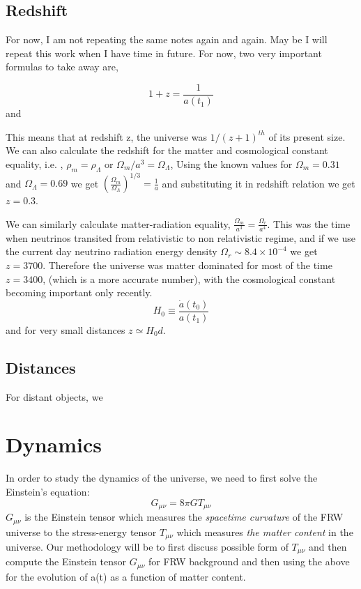 \documentclass[12pt]{report}
\newcommand{\tit}[1]{\textit{#1}}
\begin{document}
\subsection{Redshift}
For now, I am not repeating the same notes again and again. May be I will repeat this work when I have time in future. For now, two very important formulas to take away are,

\begin{equation}
1+z=\frac{1}{a(t_1)}
\end{equation}
and 

This means that at redshift z, the universe was $1/(z+1)^{th}$ of its present size. We can also calculate the redshift for the matter and cosmological constant equality, i.e. , $\rho_m= \rho_\Lambda$ or $\Omega_m/a^3= \Omega_\Lambda$, Using the known values for $\Omega_m=0.31$ and $\Omega_\Lambda=0.69$ we get ${\left(\frac{\Omega_m}{\Omega_\Lambda}\right)}^{1/3}=\frac{1}{a}$ and substituting it in redshift relation we get $z=0.3$.

We can similarly calculate matter-radiation equality, $\frac{\Omega_m}{a^3}=\frac{\Omega_r}{a^4}$. This was the time when neutrinos transited from relativistic to non relativistic regime, and if we use the current day neutrino radiation energy density $\Omega_r \sim 8.4 \times 10^{-4}$ we get  $z=3700$. Therefore the universe was matter dominated for most of the time $z=3400$, (which is a more accurate number), with the cosmological constant becoming important only recently.
\begin{equation}
H_0 \equiv \frac{\dot{a}{(t_0)}}{a(t_1)}
\end{equation}
and for very small distances $z \simeq H_0d$.

\subsection{Distances}
For distant objects, we 


\section{Dynamics}
In order to study the dynamics of the universe, we need to first solve the Einstein's equation:
\begin{equation}\label{Enseq}
G_{\mu \nu}= 8 \pi G T_{\mu \nu}
\end{equation}
$G_{\mu \nu}$ is the Einstein tensor which measures the \tit{spacetime curvature} of the FRW universe to the stress-energy tensor $T_{\mu \nu}$
 which measures \tit{the matter content} in the universe. Our methodology will be to first discuss possible form of $T_{\mu \nu}$ and then compute the Einstein tensor $G_{\mu \nu}$ for FRW background and then using the above for the evolution of a(t) as a function of matter content.
\end{document}
